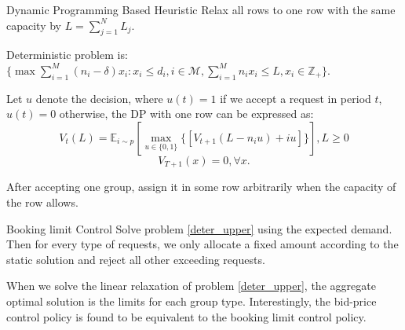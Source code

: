       \begin{frame}{Dynamic Programming Based Heuristic}
        Relax all rows to one row with the same capacity by $L = \sum_{j=1}^{N} L_j$.
        
        Deterministic problem is: $\{\max \sum_{i=1}^{M} (n_i- \delta) x_{i}: x_{i} \leq d_{i}, i \in \mathcal{M}, \sum_{i=1}^{M} n_{i} x_{i} \leq L, x_{i} \in \mathbb{Z}_{+}\}$.
        
        Let $u$ denote the decision, where $u(t) = 1$ if we accept a request in period $t$, $u(t) =0$ otherwise, the DP with one row can be expressed as:
        $$V_{t}(L) = \mathbb{E}_{i \sim p} [\max_{u \in \{0,1\}} \{ {[V_{t+1}(L-n_i u)+ i u]}\}], L \geq 0$$ 
        $$V_{T+1}(x) =0, \forall x.$$

        After accepting one group, assign it in some row arbitrarily when the capacity of the row allows.
      \end{frame}
      
      \begin{frame}{Booking limit Control}
        Solve problem \eqref{deter_upper} using the expected demand. Then for every type of requests, we only allocate a fixed amount according to the static solution and reject all other exceeding requests.
        \vspace*{1cm}
        
        When we solve the linear relaxation of problem \eqref{deter_upper}, the aggregate optimal solution is the limits for each group type. Interestingly, the bid-price control policy is found to be equivalent to the booking limit control policy.
      \end{frame}